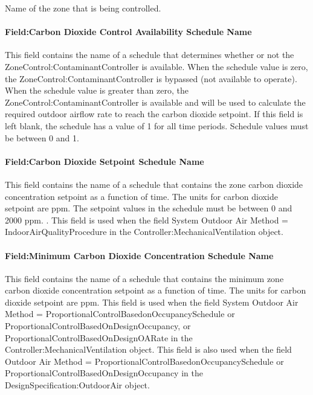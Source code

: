 Name of the zone that is being controlled.

\paragraph{Field:Carbon Dioxide Control Availability Schedule Name}\label{fieldcarbon-dioxide-control-availability-schedule-name}

This field contains the name of a schedule that determines whether or not the ZoneControl:ContaminantController is available. When the schedule value is zero, the ZoneControl:ContaminantController is bypassed (not available to operate). When the schedule value is greater than zero, the ZoneControl:ContaminantController is available and will be used to calculate the required outdoor airflow rate to reach the carbon dioxide setpoint. If this field is left blank, the schedule has a value of 1 for all time periods. Schedule values must be between 0 and 1.

\paragraph{Field:Carbon Dioxide Setpoint Schedule Name}\label{fieldcarbon-dioxide-setpoint-schedule-name}

This field contains the name of a schedule that contains the zone carbon dioxide concentration setpoint as a function of time. The units for carbon dioxide setpoint are ppm. The setpoint values in the schedule must be between 0 and 2000 ppm. . This field is used when the field System Outdoor Air Method = IndoorAirQualityProcedure in the Controller:MechanicalVentilation object.

\paragraph{Field:Minimum Carbon Dioxide Concentration Schedule Name}\label{fieldminimum-carbon-dioxide-concentration-schedule-name}

This field contains the name of a schedule that contains the minimum zone carbon dioxide concentration setpoint as a function of time. The units for carbon dioxide setpoint are ppm. This field is used when the field System Outdoor Air Method = ProportionalControlBasedonOccupancySchedule or ProportionalControlBasedOnDesignOccupancy, or ProportionalControlBasedOnDesignOARate in the Controller:MechanicalVentilation object. This field is also used when the field Outdoor Air Method = ProportionalControlBasedonOccupancySchedule or ProportionalControlBasedOnDesignOccupancy in the DesignSpecification:OutdoorAir object.

